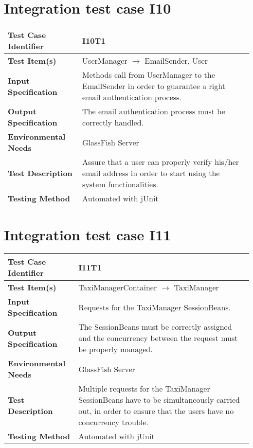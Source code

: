 \vspace{2em}

\section{Integration test case I10}

\begin{tabular}{l p{}}
    \hline
    \textbf{Test Case Identifier} & I10T1\\
    \hline
    \textbf{Test Item(s)} & UserManager $\rightarrow$ EmailSender, User \\
    \hline
    \textbf{Input Specification} & Methods call from UserManager to the EmailSender in order to guarantee a right email authentication process.\\
    \hline
    \textbf{Output Specification} & The email authentication process must be correctly handled.\\
    \hline
    \textbf{Environmental Needs} & GlassFish Server\\
    \hline
    \textbf{Test Description} & Assure that a user can properly verify his/her email address in order to start using the system functionalities.\\
    \hline
    \textbf{Testing Method} & Automated with jUnit \\
    \hline
\end{tabular}

\vspace{2em}

\section{Integration test case I11}

\begin{tabular}{l p{}}
    \hline
    \textbf{Test Case Identifier} & I11T1\\
    \hline
    \textbf{Test Item(s)} & TaxiManagerContainer $\rightarrow$ TaxiManager \\
    \hline
    \textbf{Input Specification} & Requests for the TaxiManager SessionBeans.\\
    \hline
    \textbf{Output Specification} & The SessionBeans must be correctly assigned and  the concurrency between the request must be properly managed.\\
    \hline
    \textbf{Environmental Needs} & GlassFish Server\\
    \hline
    \textbf{Test Description} & Multiple requests for the TaxiManager SessionBeans have to be simultaneously carried out, in order to ensure that the users have no concurrency trouble.\\
    \hline
    \textbf{Testing Method} & Automated with jUnit \\
    \hline
\end{tabular}

